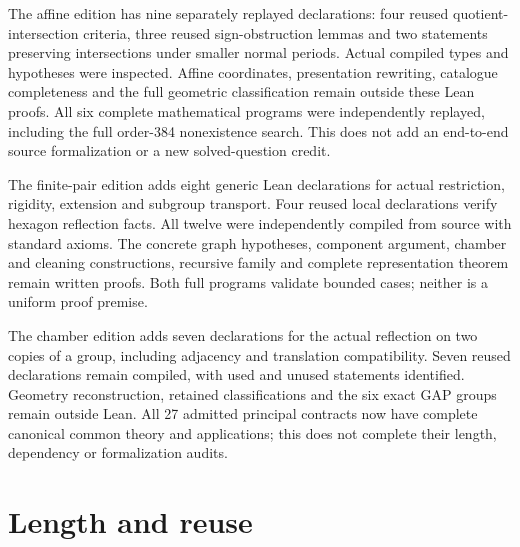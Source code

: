 \documentclass[11pt,a4paper]{article}
\begin{document}
The affine edition has nine separately replayed declarations: four reused
quotient-intersection criteria, three reused sign-obstruction lemmas and
two statements preserving intersections under smaller normal periods.
Actual compiled types and hypotheses were inspected. Affine coordinates,
presentation rewriting, catalogue completeness and the full geometric
classification remain outside these Lean proofs. All six complete
mathematical programs were independently replayed, including the full
order-384 nonexistence search. This does not add an end-to-end source
formalization or a new solved-question credit.

The finite-pair edition adds eight generic Lean declarations for actual
restriction, rigidity, extension and subgroup transport. Four reused local
declarations verify hexagon reflection facts. All twelve were independently
compiled from source with standard axioms. The concrete graph hypotheses,
component argument, chamber and cleaning constructions, recursive family
and complete representation theorem remain written proofs. Both full
programs validate bounded cases; neither is a uniform proof premise.

The chamber edition adds seven declarations for the actual reflection on
two copies of a group, including adjacency and translation compatibility.
Seven reused declarations remain compiled, with used and unused statements
identified. Geometry reconstruction, retained classifications and the six
exact GAP groups remain outside Lean. All 27 admitted principal contracts
now have complete canonical common theory and applications; this does not
complete their length, dependency or formalization audits.

\section{Length and reuse}
\end{document}

